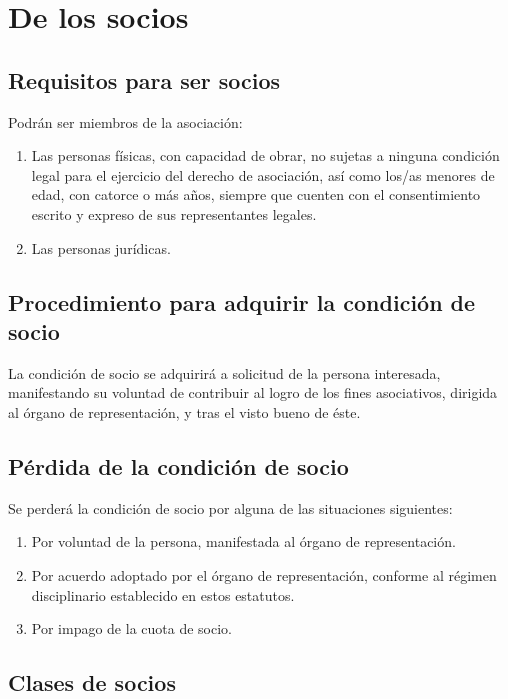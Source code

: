 \documentclass[a4paper, 12pt, oneside]{book}
\begin{document}
\chapter{De los socios}

\section{Requisitos para ser socios}

Podrán ser miembros de la asociación:

\begin{enumerate}
    \item Las personas físicas, con capacidad de obrar, no sujetas a ninguna condición legal para el ejercicio del derecho de asociación, así como los/as menores de edad, con catorce o más años, siempre que cuenten con el consentimiento escrito y expreso de sus representantes legales.
    \item Las personas jurídicas.
\end{enumerate}

\section{Procedimiento para adquirir la condición de socio}

La condición de socio se adquirirá a solicitud de la persona interesada, manifestando su voluntad de contribuir al logro de los fines asociativos, dirigida al órgano de representación, y tras el visto bueno de éste.

\section{Pérdida de la condición de socio}

Se perderá la condición de socio por alguna de las situaciones siguientes:

\begin{enumerate}
    \item Por voluntad de la persona, manifestada al órgano de representación.
    \item Por acuerdo adoptado por el órgano de representación, conforme al régimen disciplinario establecido en estos estatutos.
    \item Por impago de la cuota de socio.
\end{enumerate}

\section{Clases de socios}
\end{document}
